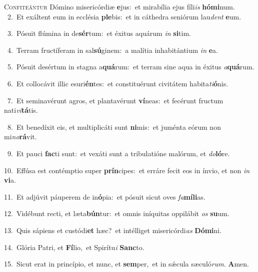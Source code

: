 \lettrine{\initial\textcolor{\initialcolor}{C}}{onfiteántur} Dómino misericórdiæ \textbf{e}\-jus:~\star et mirabília ejus fíli\textit{is} \textbf{hó}\-\textbf{mi}num.\\
{\numbfont\textcolor{\numbcolor}{~2.}}~Et exáltent eum in ecclésia \textbf{ple}\-bis:~\star et in cáthedra seniórum lau\textit{dent} \textbf{e}\-um.\par
{\numbfont\textcolor{\numbcolor}{~3.}}~Pósuit flúmina in de\-\textbf{sér}\-tum:~\star et éxitus aquárum \textit{in} \textbf{si}\-tim.\par
{\numbfont\textcolor{\numbcolor}{~4.}}~Terram fructíferam in sal\-\textbf{sú}\-ginem:~\star a malítia inhabitántium \textit{in} \textbf{e}\-a.\par
{\numbfont\textcolor{\numbcolor}{~5.}}~Pósuit desértum in stagna a\-\textbf{quá}\-rum:~\star et terram sine aqua in éxitus \textit{a}\-\textbf{quá}rum.\par
{\numbfont\textcolor{\numbcolor}{~6.}}~Et collocávit illic esuri\-\textbf{én}\-tes:~\star et constituérunt civitátem habita\-\textit{ti}\-\textbf{ó}nis.\par
{\numbfont\textcolor{\numbcolor}{~7.}}~Et seminavérunt agros, et plantavérunt \textbf{ví}\-neas:~\star et fecérunt fructum nati\-\textit{vi}\-\textbf{tá}tis.\par
{\numbfont\textcolor{\numbcolor}{~8.}}~Et benedíxit eis, et multiplicáti sunt \textbf{ni}\-mis:~\star et juménta eórum non mi\-\textit{no}\-\textbf{rá}vit.\par
{\numbfont\textcolor{\numbcolor}{~9.}}~Et pauci \textbf{fac}\-ti sunt:~\star et vexáti sunt a tribulatióne malórum, et \textit{do}\-\textbf{ló}re.\par
{\numbfont\textcolor{\numbcolor}{10.}}~Effúsa est contémptio super \textbf{prín}\-cipes:~\star et erráre fecit eos in ínvio, et non \textit{in} \textbf{vi}\-a.\par
{\numbfont\textcolor{\numbcolor}{11.}}~Et adjúvit páuperem de in\-\textbf{ó}\-pia:~\star et pósuit sicut oves \textit{fa}\-\textbf{mí}\textbf{li}as.\par
{\numbfont\textcolor{\numbcolor}{12.}}~Vidébunt recti, et læta\-\textbf{bún}\-tur:~\star et omnis iníquitas oppilábit \textit{os} \textbf{su}\-um.\par
{\numbfont\textcolor{\numbcolor}{13.}}~Quis sápiens et custódi\textbf{et} hæc?~\star et intélliget misericórdi\textit{as} \textbf{Dó}\-\textbf{mi}ni.\par
{\numbfont\textcolor{\numbcolor}{14.}}~Glória Patri, et \textbf{Fí}\-lio,~\star et Spirítu\textit{i} \textbf{Sanc}\-to.\par
{\numbfont\textcolor{\numbcolor}{15.}}~Sicut erat in princípio, et nunc, et \textbf{sem}\-per,~\star et in sǽcula sæculó\-\textit{rum}\-. \textbf{A}\-men.\par
